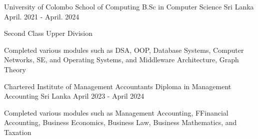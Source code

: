 

\begin{cventries}

    \cventry
    {University of Colombo School of Computing} %
    {B.Sc in Computer Science} %
    {Sri Lanka} %
    {April. 2021 - April. 2024} %
    {
        \begin{cvitems} %
            \item {Second Class Upper Division}
            \item {Completed various modules such as DSA, OOP, Database Systems, Computer Networks, SE, and Operating Systems, and Middleware Architecture, Graph Theory}
        \end{cvitems}
    }

    \cventry
    {Chartered Institute of Management Accountants} %
    {Diploma in Management Accounting} %
    {Sri Lanka} %
    {April 2023 - April 2024}
    {
        \begin{cvitems} %
            \item {Completed various modules such as Management Accounting, FFinancial Accounting, Business Economics, Business Law, Business Mathematics, and Taxation}
        \end{cvitems}
    }




\end{cventries}

